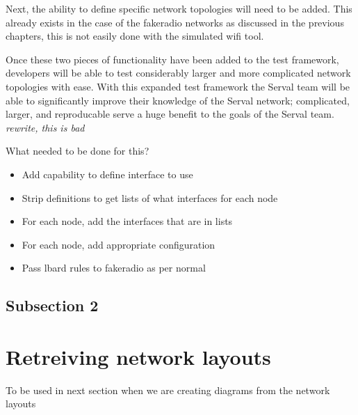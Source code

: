 Next, the ability to define specific network topologies will need to be added.
This already exists in the case of the fakeradio networks as discussed in the previous chapters, this is not easily done with the simulated wifi tool.

Once these two pieces of functionality have been added to the test framework, developers will be able to test considerably larger and more complicated network topologies with ease.
With this expanded test framework the Serval team will be able to significantly improve their knowledge of the Serval network; complicated, larger, and reproducable serve a huge benefit to the goals of the Serval team. \emph{rewrite, this is bad}



What needed to be done for this?
\begin{itemize}
    \item Add capability to define interface to use
    \item Strip definitions to get lists of what interfaces for each node
    \item For each node, add the interfaces that are in lists
    \item For each node, add appropriate configuration
    \item Pass lbard rules to fakeradio as per normal
\end{itemize}


\subsection{Subsection 2}



\section{Retreiving network layouts}
To be used in next section when we are creating diagrams from the network layouts
